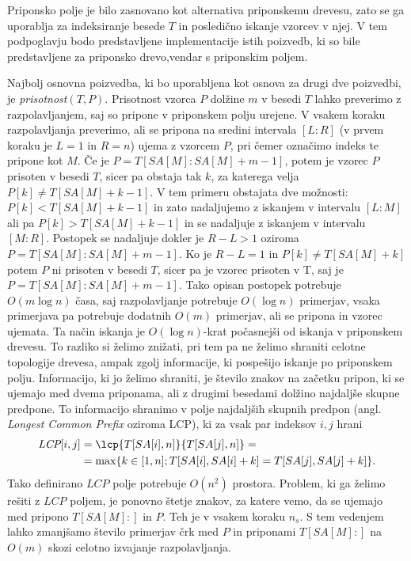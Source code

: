 Priponsko polje je bilo zasnovano kot alternativa priponskemu drevesu, zato se ga uporablja za indeksiranje besede $T$ in posledično iskanje vzorcev v njej. V tem podpoglavju bodo predstavljene implementacije istih poizvedb, ki so bile predstavljene za priponsko drevo,vendar s priponskim poljem.

Najbolj osnovna poizvedba, ki bo uporabljena kot osnova za drugi dve poizvedbi, je \textit{prisotnost}$(T,P)$. Prisotnost vzorca $P$ dolžine $m$ v besedi $T$ lahko preverimo z razpolavljanjem, saj so pripone v priponskem polju urejene. V vsakem koraku razpolavljanja preverimo, ali se pripona na sredini intervala $[L:R]$ (v prvem koraku je $L=1$ in $R=n$) ujema z vzorcem $P$, pri čemer označimo indeks te pripone kot $M$. Če je $P=T[SA[M]:SA[M]+m-1]$, potem je vzorec $P$ prisoten v besedi $T$, sicer pa obstaja tak $k$, za katerega velja $P[k]\ne T[SA[M]+k-1]$. V tem primeru obstajata dve možnosti: $P[k]<T[SA[M]+k-1]$ in zato nadaljujemo z iskanjem v intervalu $[L:M]$ ali pa $P[k]>T[SA[M]+k-1]$ in se nadaljuje z iskanjem v intervalu $[M:R]$. Postopek se nadaljuje dokler je $R-L>1$ oziroma $P=T[SA[M]:SA[M]+m-1]$. Ko je $R-L=1$ in $P[k]\ne T[SA[M]+k]$ potem $P$ ni prisoten v besedi $T$, sicer pa je vzorec prisoten v T, saj je $P=T[SA[M]:SA[M]+m-1]$. Tako opisan postopek potrebuje $O(m\log{n})$ časa, saj razpolavljanje potrebuje $O(\log{n})$ primerjav, vsaka primerjava pa potrebuje dodatnih $O(m)$ primerjav, ali se pripona in vzorec ujemata. Ta način iskanja je $O(\log{n})$-krat počasnejši od iskanja v priponskem drevesu. To razliko si želimo znižati, pri tem pa ne želimo shraniti celotne topologije drevesa, ampak zgolj informacije, ki pospešijo iskanje po priponskem polju. Informacijo, ki jo želimo shraniti, je število znakov na začetku pripon, ki se ujemajo med dvema priponama, ali z drugimi besedami dolžino najdaljše skupne predpone. To informacijo shranimo v polje najdaljših skupnih predpon (angl. \textit{Longest Common Prefix} oziroma LCP), ki za vsak par indeksov $i,j$ hrani
    \begin{equation*} 
        \begin{split}
        \textit{LCP}[i,j]&=\lcp{T[SA[i],n]}{T[SA[j],n]}=\\
         &=\max\{k\in[1,n];T[SA[i],SA[i]+k]=T[SA[j],SA[j]+k]\}.\\
        \end{split}
    \end{equation*}
Tako definirano $LCP$ polje potrebuje $O(n^2)$ prostora. Problem, ki ga želimo rešiti z $LCP$ poljem, je ponovno štetje znakov, za katere vemo, da se ujemajo med pripono $T[SA[M]:]$ in $P$. Teh je v vsakem koraku $n_s$. S tem vedenjem lahko zmanjšamo število primerjav črk med $P$ in priponami $T[SA[M]:]$ na $O(m)$ skozi celotno izvajanje razpolavljanja. 


